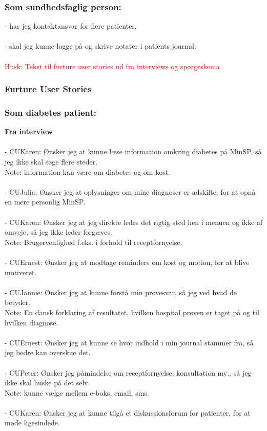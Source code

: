 \subsubsection*{Som sundhedsfaglig person:}
- har jeg kontaktansvar for flere patienter.\\
\\
- skal jeg kunne logge på og skrive notater i patients journal.\\
\\
\textcolor{red}{Husk: Tekst til furture user stories ud fra interviews og spørgeskema}
\subsubsection{Furture User Stories}
\subsubsection*{Som diabetes patient:}
\textbf{Fra interview}\\\\
- CUKaren: Ønsker jeg at kunne læse information omkring diabetes på MinSP, så jeg ikke skal søge flere steder. \\
Note: information kan være om diabetes og om kost.\\
\\
- CUJulia: Ønsker jeg at oplysninger om mine diagnoser er adskilte, for at opnå en mere personlig MinSP. \\
\\
- CUKaren: Ønsker jeg at jeg direkte ledes det rigtig sted hen i menuen og ikke af omveje, så jeg ikke leder forgæves.\\ 
Note: Brugervenlighed f.eks. i forhold til receptfornyelse.\\ 
\\
- CUErnest: Ønsker jeg at modtage reminders om kost og motion, for at blive motiveret.\\
\\
- CUJannie: Ønsker jeg at kunne forstå min prøvesvar, så jeg ved hvad de betyder. \\
Note: En dansk forklaring af resultatet, hvilken hospital prøven er taget på og til hvilken diagnose. \\
\\
- CUErnest: Ønsker jeg at kunne se hvor indhold i min journal stammer fra, så jeg bedre kan overskue det.\\
\\
- CUPeter: Ønsker jeg påmindelse om receptfornyelse, konsultation mv., så jeg ikke skal huske på det selv.\\ 
Note: kunne vælge mellem e-boks, email, sms.\\
\\
- CUKaren: Ønsker jeg at kunne tilgå et diskussionsforum for patienter, for at møde ligesindede.\\
%
